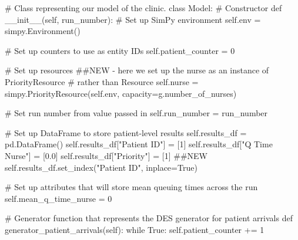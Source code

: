\documentclass[
  letterpaper,
  DIV=11,
  numbers=noendperiod]{scrreprt}
\newenvironment{Shaded}{\begin{snugshade}}{\end{snugshade}}
\newcommand{\CommentTok}[1]{\textcolor[rgb]{0.37,0.37,0.37}{#1}}
\newcommand{\ControlFlowTok}[1]{\textcolor[rgb]{0.00,0.23,0.31}{#1}}
\newcommand{\DecValTok}[1]{\textcolor[rgb]{0.68,0.00,0.00}{#1}}
\newcommand{\FloatTok}[1]{\textcolor[rgb]{0.68,0.00,0.00}{#1}}
\newcommand{\FunctionTok}[1]{\textcolor[rgb]{0.28,0.35,0.67}{#1}}
\newcommand{\KeywordTok}[1]{\textcolor[rgb]{0.00,0.23,0.31}{#1}}
\newcommand{\NormalTok}[1]{\textcolor[rgb]{0.00,0.23,0.31}{#1}}
\newcommand{\OperatorTok}[1]{\textcolor[rgb]{0.37,0.37,0.37}{#1}}
\newcommand{\StringTok}[1]{\textcolor[rgb]{0.13,0.47,0.30}{#1}}
\newcommand{\VariableTok}[1]{\textcolor[rgb]{0.07,0.07,0.07}{#1}}
\begin{document}
\begin{tcolorbox}
\begin{Shaded}
\begin{Highlighting}[]
\CommentTok{\# Class representing our model of the clinic.}
\KeywordTok{class}\NormalTok{ Model:}
    \CommentTok{\# Constructor}
    \KeywordTok{def} \FunctionTok{\_\_init\_\_}\NormalTok{(}\VariableTok{self}\NormalTok{, run\_number):}
        \CommentTok{\# Set up SimPy environment}
        \VariableTok{self}\NormalTok{.env }\OperatorTok{=}\NormalTok{ simpy.Environment()}

        \CommentTok{\# Set up counters to use as entity IDs}
        \VariableTok{self}\NormalTok{.patient\_counter }\OperatorTok{=} \DecValTok{0}

        \CommentTok{\# Set up resources}
        \CommentTok{\#\#NEW {-} here we set up the nurse as an instance of PriorityResource}
        \CommentTok{\# rather than Resource}
        \VariableTok{self}\NormalTok{.nurse }\OperatorTok{=}\NormalTok{ simpy.PriorityResource(}\VariableTok{self}\NormalTok{.env,}
\NormalTok{                                            capacity}\OperatorTok{=}\NormalTok{g.number\_of\_nurses)}

        \CommentTok{\# Set run number from value passed in}
        \VariableTok{self}\NormalTok{.run\_number }\OperatorTok{=}\NormalTok{ run\_number}

        \CommentTok{\# Set up DataFrame to store patient{-}level results}
        \VariableTok{self}\NormalTok{.results\_df }\OperatorTok{=}\NormalTok{ pd.DataFrame()}
        \VariableTok{self}\NormalTok{.results\_df[}\StringTok{"Patient ID"}\NormalTok{] }\OperatorTok{=}\NormalTok{ [}\DecValTok{1}\NormalTok{]}
        \VariableTok{self}\NormalTok{.results\_df[}\StringTok{"Q Time Nurse"}\NormalTok{] }\OperatorTok{=}\NormalTok{ [}\FloatTok{0.0}\NormalTok{]}
        \VariableTok{self}\NormalTok{.results\_df[}\StringTok{"Priority"}\NormalTok{] }\OperatorTok{=}\NormalTok{ [}\DecValTok{1}\NormalTok{] }\CommentTok{\#\#NEW}
        \VariableTok{self}\NormalTok{.results\_df.set\_index(}\StringTok{"Patient ID"}\NormalTok{, inplace}\OperatorTok{=}\VariableTok{True}\NormalTok{)}

        \CommentTok{\# Set up attributes that will store mean queuing times across the run}
        \VariableTok{self}\NormalTok{.mean\_q\_time\_nurse }\OperatorTok{=} \DecValTok{0}

    \CommentTok{\# Generator function that represents the DES generator for patient arrivals}
    \KeywordTok{def}\NormalTok{ generator\_patient\_arrivals(}\VariableTok{self}\NormalTok{):}
        \ControlFlowTok{while} \VariableTok{True}\NormalTok{:}
            \VariableTok{self}\NormalTok{.patient\_counter }\OperatorTok{+=} \DecValTok{1}


\end{Highlighting}
\end{Shaded}
\end{tcolorbox}
\end{document}
